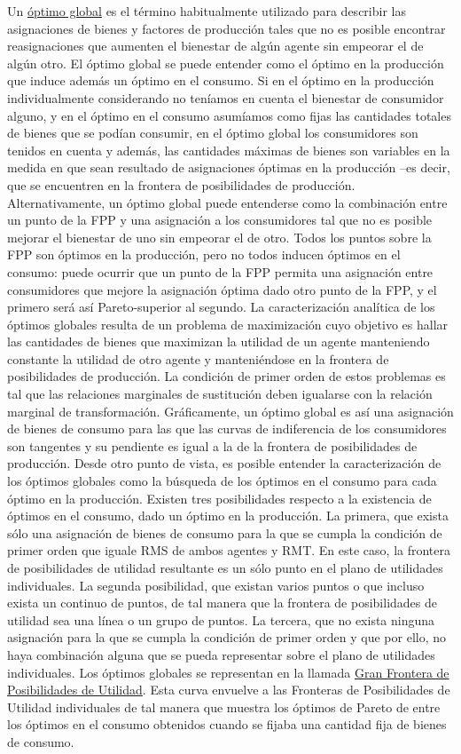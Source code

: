 \documentclass{nuevotema}
\begin{document}
Un \underline{óptimo global} es el término habitualmente utilizado para describir las asignaciones de bienes y factores de producción tales que no es posible encontrar reasignaciones que aumenten el bienestar de algún agente sin empeorar el de algún otro. El óptimo global se puede entender como el óptimo en la producción que induce además un óptimo en el consumo. Si en el óptimo en la producción individualmente considerando no teníamos en cuenta el bienestar de consumidor alguno, y en el óptimo en el consumo asumíamos como fijas las cantidades totales de bienes que se podían consumir, en el óptimo global los consumidores son tenidos en cuenta y además, las cantidades máximas de bienes son variables en la medida en que sean resultado de asignaciones óptimas en la producción --es decir, que se encuentren en la frontera de posibilidades de producción. Alternativamente, un óptimo global puede entenderse como la combinación entre un punto de la FPP y una asignación a los consumidores tal que no es posible mejorar el bienestar de uno sin empeorar el de otro. Todos los puntos sobre la FPP son óptimos en la producción, pero no todos inducen óptimos en el consumo: puede ocurrir que un punto de la FPP permita una asignación entre consumidores que mejore la asignación óptima dado otro punto de la FPP, y el primero será así Pareto-superior al segundo. La caracterización analítica de los óptimos globales resulta de un problema de maximización cuyo objetivo es hallar las cantidades de bienes que maximizan la utilidad de un agente manteniendo constante la utilidad de otro agente y manteniéndose en la frontera de posibilidades de producción. La condición de primer orden de estos problemas es tal que las relaciones marginales de sustitución deben igualarse con la relación marginal de transformación. Gráficamente, un óptimo global es así una asignación de bienes de consumo para las que las curvas de indiferencia de los consumidores son tangentes y su pendiente es igual a la de la frontera de posibilidades de producción. Desde otro punto de vista, es posible entender la caracterización de los óptimos globales como la búsqueda de los óptimos en el consumo para cada óptimo en la producción. Existen tres posibilidades respecto a la existencia de óptimos en el consumo, dado un óptimo en la producción. La primera, que exista sólo una asignación de bienes de consumo para la que se cumpla la condición de primer orden que iguale RMS de ambos agentes y RMT. En este caso, la frontera de posibilidades de utilidad resultante es un sólo punto en el plano de utilidades individuales. La segunda posibilidad, que existan varios puntos o que incluso exista un continuo de puntos, de tal manera que la frontera de posibilidades de utilidad sea una línea o un grupo de puntos. La tercera, que no exista ninguna asignación para la que se cumpla la condición de primer orden y que por ello, no haya combinación alguna que se pueda representar sobre el plano de utilidades individuales. Los óptimos globales se representan en la llamada \underline{Gran Frontera de Posibilidades de Utilidad}. Esta curva envuelve a las Fronteras de Posibilidades de Utilidad individuales de tal manera que muestra los óptimos de Pareto de entre los óptimos en el consumo obtenidos cuando se fijaba una cantidad fija de bienes de consumo. 
\end{document}
